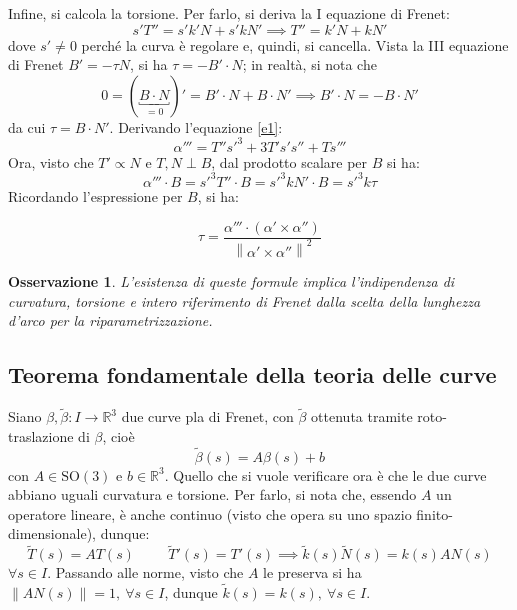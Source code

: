 \documentclass[12pt]{scrartcl}
\theoremstyle{style}
\newtheorem{osservazione}{Osservazione}[section]
\newenvironment{boxenv}[1][]{
    \begin{eqbox}[#1]
    }{
   \end{eqbox}
}
\numberwithin{equation}{subsection}
\begin{document}
\noindent Infine, si calcola la torsione. 
Per farlo, si deriva la I equazione di Frenet:
\[
s'T'' = s'k'N + s'k N'  \implies T'' = k'N + kN'
\] 
dove $s' \neq 0$ perch\'e la curva \`e regolare e, quindi, si cancella.
Vista la III equazione di Frenet $B'  = -\tau N $, si ha $\tau  = - B' \cdot N$; in realt\`a, si nota che
\[
	0=(\underbracket{B\cdot N}_{=0} )'= B' \cdot N + B \cdot N'\implies B' \cdot N = - B\cdot N'
\] 
da cui $\tau  = B \cdot N'$.
Derivando l'equazione \ref{e1}:
\[
\alpha '''= T'' s'^3 + 3T's's'' + Ts''' 
\] 
Ora, visto che $T' \propto N$ e $T,N \perp B$, dal prodotto scalare per $B$ si ha:
\[
\alpha ''' \cdot B = s'^3T '' \cdot B = s'^3k N' \cdot B= s'^3 k \tau 
\] 
Ricordando l'espressione per $B$, si ha:
\begin{boxenv}[]
\[
\tau = \frac{\alpha ''' \cdot (\alpha ' \times \alpha '')}{\left\lVert \alpha ' \times \alpha '' \right\rVert ^2 } 
\] 
\end{boxenv}
\begin{osservazione}
L'esistenza di queste formule implica l'indipendenza di curvatura, torsione e intero riferimento di Frenet dalla scelta della lunghezza d'arco per la riparametrizzazione.
\end{osservazione}
\subsection{Teorema fondamentale della teoria delle curve}
Siano $\beta , \widetilde{\beta }:I\to \mathbb{R}^3$ due curve pla di Frenet, con $\widetilde{\beta }$ ottenuta tramite roto-traslazione di $\beta $, cio\`e
\[
\widetilde{\beta }(s) = A \beta (s) + b
\] 
con $A \in \mathrm{SO} (3)$ e $b \in \mathbb{R}^3$.
Quello che si vuole verificare ora \`e che le due curve abbiano uguali curvatura e torsione.
Per farlo, si nota che, essendo $A$ un operatore lineare, \`e anche continuo (visto che opera su uno spazio finito-dimensionale), dunque:
\[
\widetilde{T}(s) = A T(s)  \hspace{1cm} \widetilde{T}' (s) = T'(s) \implies \widetilde{k}(s) \widetilde{N}(s) = k(s) A N(s)
\] 
$\forall s \in I $.
Passando alle norme, visto che $A$ le preserva si ha $\left\lVert A N(s) \right\rVert = 1, \ \forall s \in I $, dunque $\widetilde{k}(s) = k(s), \ \forall s \in I$.
\end{document}
